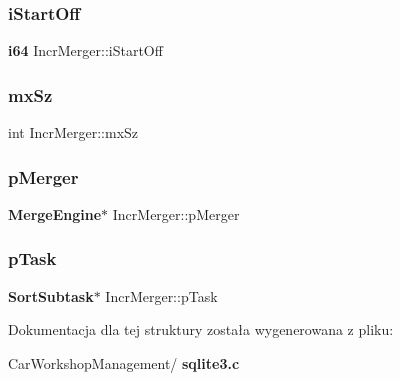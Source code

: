 \mbox{\label{struct_incr_merger_a88153aef88037ccac55eb5c9209a3e1b}} 
\subsubsection{iStartOff}
{\footnotesize\ttfamily \textbf{ i64} Incr\+Merger\+::i\+Start\+Off}

\mbox{\label{struct_incr_merger_a333e98e9e5e951e2e00a109a95c4fbab}} 
\subsubsection{mxSz}
{\footnotesize\ttfamily int Incr\+Merger\+::mx\+Sz}

\mbox{\label{struct_incr_merger_ac7335fe89a94112b63e206ac48656f4e}} 
\subsubsection{pMerger}
{\footnotesize\ttfamily \textbf{ Merge\+Engine}$\ast$ Incr\+Merger\+::p\+Merger}

\mbox{\label{struct_incr_merger_a2b941a6bbca7d5c0fc0c0391c44eccda}} 
\subsubsection{pTask}
{\footnotesize\ttfamily \textbf{ Sort\+Subtask}$\ast$ Incr\+Merger\+::p\+Task}



Dokumentacja dla tej struktury została wygenerowana z pliku\+:\begin{DoxyCompactItemize}
\item 
Car\+Workshop\+Management/\textbf{ sqlite3.\+c}\end{DoxyCompactItemize}
